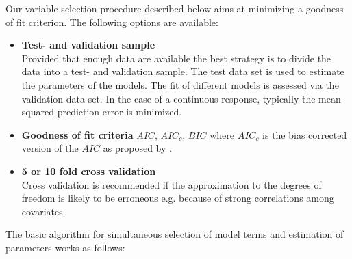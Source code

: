 \documentclass[11pt,a4paper,twoside]{bayesxarticle}
\begin{document}
Our variable selection procedure described below aims at minimizing a goodness of fit criterion. The following
options are available:
\begin{itemize}
\item {\bf Test- and validation sample} \\
Provided that enough data are available the best strategy is to divide the data into a test- and validation
sample. The test data set is used to estimate the parameters of the models. The fit of different models
is assessed via the validation data set. In the case of a continuous response, typically the mean squared prediction
error is minimized.
\item {\bf Goodness of fit criteria}  $AIC$, $AIC_{c}$, $BIC$ where $AIC_c$ is the bias corrected version of the $AIC$ as
    proposed by .
\item {\bf 5 or 10 fold cross validation} \\
Cross validation is recommended
if the approximation to the degrees of freedom is likely to be erroneous e.g. because of strong correlations among covariates.
\end{itemize}

The basic algorithm for simultaneous selection of model terms and
estimation of parameters works as follows:
\end{document}
